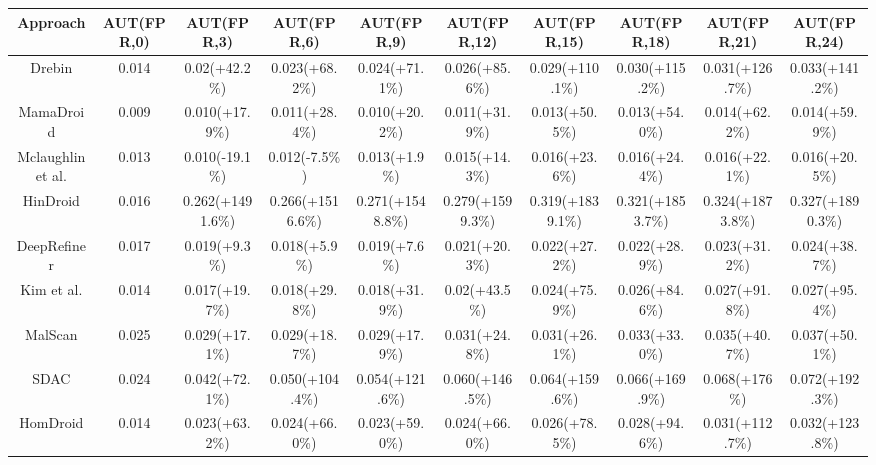 \begin{table}[t]
\begin{adjustbox}{width=\textwidth}
\begin{tabular}{@{}c|c|c|c|c|c|c|c|c|c@{}}
            \textbf{Approach}         & \textbf{AUT(FPR,0)} & \textbf{AUT(FPR,3)} & \textbf{AUT(FPR,6)} & \textbf{AUT(FPR,9)} & \textbf{AUT(FPR,12)} & \textbf{AUT(FPR,15)} & \textbf{AUT(FPR,18)} & \textbf{AUT(FPR,21)} & \textbf{AUT(FPR,24)} \\ \midrule
            Drebin            & 0.014               & 0.02(+42.2\%)       & 0.023(+68.2\%)      & 0.024(+71.1\%)      & 0.026(+85.6\%)       & 0.029(+110.1\%)      & 0.030(+115.2\%)      & 0.031(+126.7\%)      & 0.033(+141.2\%)      \\ \midrule
            MamaDroid         & 0.009               & 0.010(+17.9\%)      & 0.011(+28.4\%)      & 0.010(+20.2\%)      & 0.011(+31.9\%)       & 0.013(+50.5\%)       & 0.013(+54.0\%)       & 0.014(+62.2\%)       & 0.014(+59.9\%)       \\ \midrule
            Mclaughlin et al. & 0.013               & 0.010(-19.1\%)      & 0.012(-7.5\%)       & 0.013(+1.9\%)       & 0.015(+14.3\%)       & 0.016(+23.6\%)       & 0.016(+24.4\%)       & 0.016(+22.1\%)       & 0.016(+20.5\%)       \\ \midrule
            HinDroid          & 0.016               & 0.262(+1491.6\%)    & 0.266(+1516.6\%)    & 0.271(+1548.8\%)    & 0.279(+1599.3\%)     & 0.319(+1839.1\%)     & 0.321(+1853.7\%)     & 0.324(+1873.8\%)     & 0.327(+1890.3\%)     \\ \midrule
            DeepRefiner       & 0.017               & 0.019(+9.3\%)       & 0.018(+5.9\%)       & 0.019(+7.6\%)       & 0.021(+20.3\%)       & 0.022(+27.2\%)       & 0.022(+28.9\%)       & 0.023(+31.2\%)       & 0.024(+38.7\%)       \\ \midrule
            Kim et al.        & 0.014               & 0.017(+19.7\%)      & 0.018(+29.8\%)      & 0.018(+31.9\%)      & 0.02(+43.5\%)        & 0.024(+75.9\%)       & 0.026(+84.6\%)       & 0.027(+91.8\%)       & 0.027(+95.4\%)       \\ \midrule
            MalScan           & 0.025               & 0.029(+17.1\%)      & 0.029(+18.7\%)      & 0.029(+17.9\%)      & 0.031(+24.8\%)       & 0.031(+26.1\%)       & 0.033(+33.0\%)       & 0.035(+40.7\%)       & 0.037(+50.1\%)       \\ \midrule
            SDAC              & 0.024               & 0.042(+72.1\%)      & 0.050(+104.4\%)     & 0.054(+121.6\%)     & 0.060(+146.5\%)      & 0.064(+159.6\%)      & 0.066(+169.9\%)      & 0.068(+176\%)        & 0.072(+192.3\%)      \\ \midrule
            HomDroid          & 0.014               & 0.023(+63.2\%)      & 0.024(+66.0\%)      & 0.023(+59.0\%)      & 0.024(+66.0\%)       & 0.026(+78.5\%)       & 0.028(+94.6\%)       & 0.031(+112.7\%)      & 0.032(+123.8\%)      \\ \midrule

\end{tabular}
\end{adjustbox}
\end{table}
